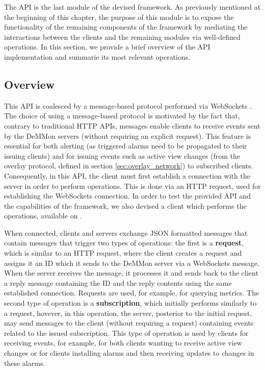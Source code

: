 
The API is the last module of the devised framework. As previously mentioned at the beginning of this chapter, the purpose of this module is to expose the functionality of the remaining components of the framework by mediating the interactions between the clients and the remaining modules via well-defined operations. In this section, we provide a brief overview of the API implementation and summarie its most relevant operations. 

\subsection{Overview}

This API is coalesced by a message-based protocol performed via WebSockets \cite{websocketsRFC}. The choice of using a message-based protocol is motivated by the fact that, contrary to traditional HTTP APIs, messages enable clients to receive events sent by the DeMMon servers (without requiring an explicit request). This feature is essential for both alerting (as triggered alarms need to be propagated to their issuing clients) and for issuing events such as active view changes (from the overlay protocol, defined in section \ref{sec:overlay_network}) to subscribed clients. Consequently, in this API, the client must first establish a connection with the server in order to perform operations. This is done via an HTTP request, used for establishing the WebSockets connection. In order to test the provided API and the capabilities of the framework, we also devised a client which performs the operations, available on \cite{demmon-client-repo}.

When connected, clients and servers exchange JSON formatted messages that contain messages that trigger two types of operations: the first is a \textbf{request}, which is similar to an HTTP request, where the client creates a request and assigns it an ID which it sends to the DeMMon server via a WebSockets message. When the server receives the message, it processes it and sends back to the client a reply message containing the ID and the reply contents using the same established connection. Requests are used, for example, for querying metrics. The second type of operation is a \textbf{subscription}, which initially performs similarly to a request, hovever, in this operation, the server, posterior to the initial request, may send messages to the client (without requiring a request) containing events related to the issued subscription. This type of operation is used by clients for receiving events, for example, for both clients wanting to receive active view changes or for clients installing alarms and then receiving updates to changes in these alarms.

